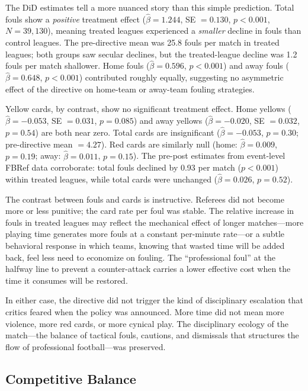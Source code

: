 The DiD estimates tell a more nuanced story than this simple prediction. Total
fouls show a \emph{positive} treatment effect ($\hat{\beta} = 1.244$,
SE $= 0.130$, $p < 0.001$, $N = 39{,}130$), meaning treated leagues experienced
a \emph{smaller} decline in fouls than control leagues. The pre-directive mean
was 25.8 fouls per match in treated leagues; both groups saw secular declines,
but the treated-league decline was 1.2 fouls per match shallower. Home fouls
($\hat{\beta} = 0.596$, $p < 0.001$) and away fouls ($\hat{\beta} = 0.648$,
$p < 0.001$) contributed roughly equally, suggesting no asymmetric effect of
the directive on home-team or away-team fouling strategies.

Yellow cards, by contrast, show no significant treatment effect. Home yellows
($\hat{\beta} = -0.053$, SE $= 0.031$, $p = 0.085$) and away yellows
($\hat{\beta} = -0.020$, SE $= 0.032$, $p = 0.54$) are both near zero. Total
cards are insignificant ($\hat{\beta} = -0.053$, $p = 0.30$; pre-directive mean
$= 4.27$). Red cards are similarly null (home: $\hat{\beta} = 0.009$,
$p = 0.19$; away: $\hat{\beta} = 0.011$, $p = 0.15$). The pre-post estimates
from event-level FBRef data corroborate: total fouls declined by 0.93 per match
($p < 0.001$) within treated leagues, while total cards were unchanged
($\hat{\beta} = 0.026$, $p = 0.52$).

The contrast between fouls and cards is instructive. Referees did not become more or less punitive; the card rate per foul was stable. The relative increase in fouls in treated leagues may reflect the mechanical effect of longer matches---more playing time generates more fouls at a constant per-minute rate---or a subtle behavioral response in which teams, knowing that wasted time will be added back, feel less need to economize on fouling. The ``professional foul'' at the halfway line to prevent a counter-attack carries a lower effective cost when the time it consumes will be restored.

In either case, the directive did not trigger the kind of disciplinary escalation that critics feared when the policy was announced. More time did not mean more violence, more red cards, or more cynical play. The disciplinary ecology of the match---the balance of tactical fouls, cautions, and dismissals that structures the flow of professional football---was preserved.


\subsection{Competitive Balance}
\label{subsec:competitive_balance}

